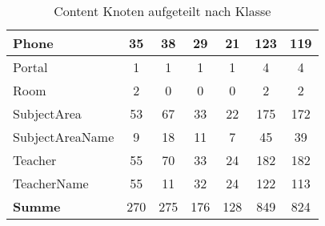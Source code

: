 \begin{table}[htb]
\begin{tabular}{|l|c|c|c|c|c|c|}
            Phone              & 35                                 & 38                                  & 29                                   & 21                                 & 123                                 & 119                                \\ \hline
            Portal             & 1                                  & 1                                   & 1                                    & 1                                  & 4                                   & 4                                  \\ \hline
            Room               & 2                                  & 0                                   & 0                                    & 0                                  & 2                                   & 2                                  \\ \hline
            SubjectArea        & 53                                 & 67                                  & 33                                   & 22                                 & 175                                 & 172                                \\ \hline
            SubjectAreaName    & 9                                  & 18                                  & 11                                   & 7                                  & 45                                  & 39                                 \\ \hline
            Teacher            & 55                                 & 70                                  & 33                                   & 24                                 & 182                                 & 182                                \\ \hline
            TeacherName        & 55                                 & 11                                  & 32                                   & 24                                 & 122                                 & 113                                \\ \hline
            \hline
            \textbf{Summe}     & 270                                & 275                                 & 176                                  & 128                                & 849                                 & 824                                \\ \hline
        \end{tabular}
        \caption{Content Knoten aufgeteilt nach Klasse}
        \label{table:findingsTeachersFiguresContentNodesByClass}
    \end{table}

